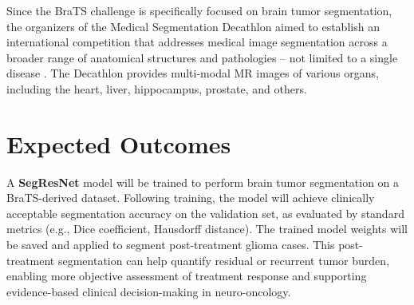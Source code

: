 \documentclass[12pt, onecolumn]{IEEEtran}
\begin{document}
Since the BraTS challenge is specifically focused on brain tumor segmentation, the organizers of the Medical Segmentation Decathlon aimed to establish an international competition that addresses medical image segmentation across a broader range of anatomical structures and pathologies -- not limited to a single disease \cite{antonelli2022}. The Decathlon provides multi-modal MR images of various organs, including the heart, liver, hippocampus, prostate, and others.

\section{Expected Outcomes}
A \textbf{SegResNet} model will be trained to perform brain tumor segmentation on a BraTS-derived dataset. Following training, the model will achieve clinically acceptable segmentation accuracy on the validation set, as evaluated by standard metrics (e.g., Dice coefficient, Hausdorff distance). The trained model weights will be saved and applied to segment post-treatment glioma cases. This post-treatment segmentation can help quantify residual or recurrent tumor burden, enabling more objective assessment of treatment response and supporting evidence-based clinical decision-making in neuro-oncology.
\end{document}
